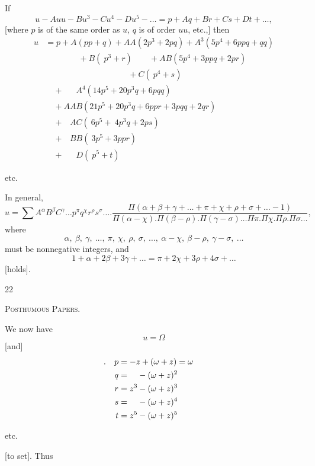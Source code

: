 If
\[
u-Auu-Bu^3-Cu^4-Du^5-\ldots=p+Aq+Br+Cs+Dt+\ldots,
\]
[where $p$ is of the same order as $u$, $q$ is of order $uu$, etc.,] then
\[
\begin{aligned}
u&=p+A(pp+q)+AA(2p^3+2pq)+A^3(5p^4+6ppq+qq)\\
&\qquad\qquad+B(\ p^3+r)\qquad+AB(5p^4+3ppq+2pr)\\
&\qquad\qquad\qquad\qquad\qquad+C(\ p^4+s)\\
&\quad+\phantom{AA}A^4(14p^5+20p^3q+6pqq)\\
&\quad+AAB(21p^5+20p^3q+6ppr+3pqq+2qr)\\
&\quad+\phantom{A}AC(\ 6p^5+\ 4p^3q+2ps)\\
&\quad+\phantom{A}BB(\ 3p^5+3ppr)\\
&\quad+\phantom{AA}D(\ p^5+t)
\end{aligned}
\]
\begin{center}etc.\end{center}
In general,
\[
u=\sum A^\alpha B^\beta C^\gamma\ldots p^\pi q^\chi r^\rho s^\sigma\ldots.
\frac{\Pi(\alpha+\beta+\gamma+\ldots+\pi+\chi+\rho+\sigma+\ldots-1)}{\Pi(\alpha-\chi).\Pi(\beta-\rho).\Pi(\gamma-\sigma)\ldots\Pi\pi.\Pi\chi.\Pi\rho.\Pi\sigma\ldots},
\]
where
\[
\alpha,\ \beta,\ \gamma,\ \ldots,\ \pi,\ \chi,\ \rho,\ \sigma,\ \ldots,\ \alpha-\chi,\ \beta-\rho,\ \gamma-\sigma,\ \ldots
\]
must be nonnegative integers, and
\[
1+\alpha+2\beta+3\gamma+\ldots=\pi+2\chi+3\rho+4\sigma+\ldots
\]
[holds].
\par\endgroup
\vfill{}\hfill22\hspace*{2cm}\par
\clearpage
{}\hfill\textsc{Posthumous Papers.}\hfill\mbox{}\par\medskip
We now have
\[
u=\Omega
\]
[and]
\[
\begin{aligned}
\rlap{\hspace{-1.3em}.}p&=-z+(\omega+z)=\omega\\
q&=\phantom{z^3}-(\omega+z)^2\\
r&=z^3-(\omega+z)^3\\
s&=\phantom{z^3}-(\omega+z)^4\\
t&=z^5-(\omega+z)^5
\end{aligned}
\]
\begin{center}etc.\end{center}
\noindent{}[to set]. Thus
\begingroup\small
